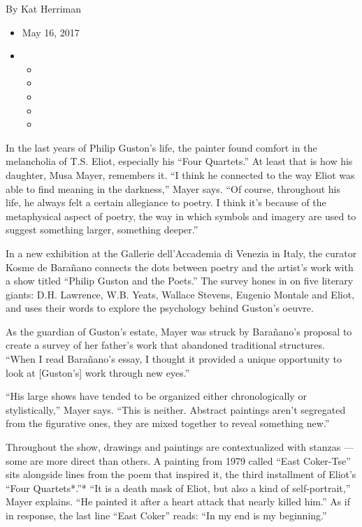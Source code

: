 By Kat Herriman

\begin{itemize}
\item
  May 16, 2017
\item
  \begin{itemize}
  \item
  \item
  \item
  \item
  \item
  \end{itemize}
\end{itemize}

In the last years of Philip Guston's life, the painter found comfort in
the melancholia of T.S. Eliot, especially his ``Four Quartets.'' At
least that is how his daughter, Musa Mayer, remembers it. ``I think he
connected to the way Eliot was able to find meaning in the darkness,''
Mayer says. ``Of course, throughout his life, he always felt a certain
allegiance to poetry. I think it's because of the metaphysical aspect of
poetry, the way in which symbols and imagery are used to suggest
something larger, something deeper.''

In a new exhibition at the Gallerie dell'Accademia di Venezia in Italy,
the curator Kosme de Barañano connects the dots between poetry and the
artist's work with a show titled ``Philip Guston and the Poets.'' The
survey hones in on five literary giants: D.H. Lawrence, W.B. Yeats,
Wallace Stevens, Eugenio Montale and Eliot, and uses their words to
explore the psychology behind Guston's oeuvre.

As the guardian of Guston's estate, Mayer was struck by Barañano's
proposal to create a survey of her father's work that abandoned
traditional structures. ``When I read Barañano's essay, I thought it
provided a unique opportunity to look at {[}Guston's{]} work through new
eyes.''

``His large shows have tended to be organized either chronologically or
stylistically,'' Mayer says. ``This is neither. Abstract paintings
aren't segregated from the figurative ones, they are mixed together to
reveal something new.''

Throughout the show, drawings and paintings are contextualized with
stanzas --- some are more direct than others. A painting from 1979
called ``East Coker-Tse'' sits alongside lines from the poem that
inspired it, the third installment of Eliot's ``Four Quartets*.''* ``It
is a death mask of Eliot, but also a kind of self-portrait,'' Mayer
explains. ``He painted it after a heart attack that nearly killed him.''
As if in response, the last line ``East Coker'' reads: ``In my end is my
beginning.''

